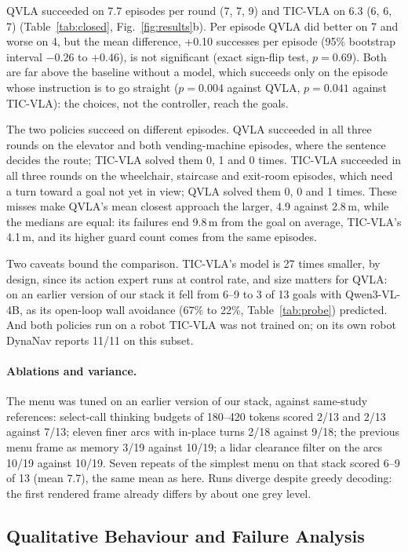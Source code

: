 \documentclass[runningheads]{llncs}
\begin{document}
QVLA succeeded on 7.7 episodes per round (7, 7, 9) and TIC-VLA on 6.3 (6, 6, 7)
(Table~\ref{tab:closed}, Fig.~\ref{fig:results}b). Per episode QVLA did better on 7 and worse on 4, but the mean difference,
+0.10 successes per episode (95\% bootstrap interval $-0.26$ to $+0.46$), is not significant
(exact sign-flip test, $p=0.69$). Both are far above the baseline without a model, which
succeeds only on the episode whose instruction is to go straight ($p=0.004$ against QVLA,
$p=0.041$ against TIC-VLA): the choices, not the controller, reach the goals.

The two policies succeed on different episodes. QVLA succeeded in all three rounds on the
elevator and both vending-machine episodes, where the sentence decides the route; TIC-VLA
solved them 0, 1 and 0 times. TIC-VLA succeeded in all three rounds on the wheelchair,
staircase and exit-room episodes, which need a turn toward a goal not yet in view; QVLA solved
them 0, 0 and 1 times. These misses make QVLA's mean closest approach the larger, 4.9 against
2.8\,m, while the medians are equal: its failures end 9.8\,m from the goal on average,
TIC-VLA's 4.1\,m, and its higher guard count comes from the same episodes.

Two caveats bound the comparison. TIC-VLA's model is 27 times smaller, by design, since its
action expert runs at control rate, and size matters for QVLA: on an earlier version of our
stack it fell from 6--9 to 3 of 13 goals with Qwen3-VL-4B, as its open-loop wall avoidance
(67\% to 22\%, Table~\ref{tab:probe}) predicted. And both policies run on a robot TIC-VLA was
not trained on; on its own robot DynaNav reports 11/11 on this subset.

\paragraph{Ablations and variance.} The menu was tuned on an earlier version of our stack,
against same-study references: select-call thinking budgets of 180--420 tokens scored 2/13
and 2/13 against 7/13; eleven finer arcs with in-place turns 2/18 against 9/18; the previous
menu frame as memory 3/19 against 10/19; a lidar clearance filter on the arcs 10/19 against
10/19. Seven repeats of the simplest menu on that stack scored 6--9 of 13 (mean 7.7), the same
mean as here. Runs diverge despite greedy decoding: the first rendered frame already differs
by about one grey level.

\subsection{Qualitative Behaviour and Failure Analysis}
\label{sec:qual}
\end{document}
